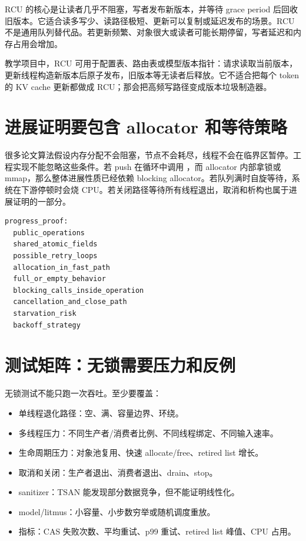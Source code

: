 RCU 的核心是让读者几乎不阻塞，写者发布新版本，并等待 grace period 后回收旧版本。它适合读多写少、读路径极短、更新可以复制或延迟发布的场景。RCU 不是通用队列替代品。若更新频繁、对象很大或读者可能长期停留，写者延迟和内存占用会增加。

教学项目中，RCU 可用于配置表、路由表或模型版本指针：请求读取当前版本，更新线程构造新版本后原子发布，旧版本等无读者后释放。它不适合把每个 token 的 KV cache 更新都做成 RCU；那会把高频写路径变成版本垃圾制造器。

\section{进展证明要包含 allocator 和等待策略}

很多论文算法假设内存分配不会阻塞，节点不会耗尽，线程不会在临界区暂停。工程实现不能忽略这些条件。若 push 在循环中调用 ，而 allocator 内部拿锁或 mmap，那么整体进展性质已经依赖 blocking allocator。若队列满时自旋等待，系统在下游停顿时会烧 CPU。若关闭路径等待所有线程退出，取消和析构也属于进展证明的一部分。

\begin{lstlisting}[numbers=none,caption={进展证明字段}]
progress_proof:
  public_operations
  shared_atomic_fields
  possible_retry_loops
  allocation_in_fast_path
  full_or_empty_behavior
  blocking_calls_inside_operation
  cancellation_and_close_path
  starvation_risk
  backoff_strategy
\end{lstlisting}

\section{测试矩阵：无锁需要压力和反例}

无锁测试不能只跑一次吞吐。至少要覆盖：

\begin{itemize}
  \item 单线程退化路径：空、满、容量边界、环绕。
  \item 多线程压力：不同生产者/消费者比例、不同线程绑定、不同输入速率。
  \item 生命周期压力：对象池复用、快速 allocate/free、retired list 增长。
  \item 取消和关闭：生产者退出、消费者退出、drain、stop。
  \item sanitizer：TSAN 能发现部分数据竞争，但不能证明线性化。
  \item model/litmus：小容量、小步数穷举或随机调度重放。
  \item 指标：CAS 失败次数、平均重试、p99 重试、retired list 峰值、CPU 占用。
\end{itemize}

